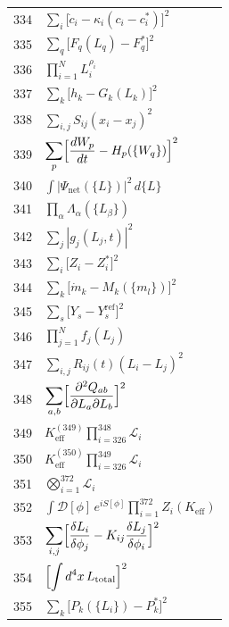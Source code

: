 \documentclass[12pt,a4paper]{article}
\begin{document}
\begin{longtable}{r p{}}
		334 & \(\displaystyle \sum_i\bigl[\dot c_i - \kappa_i(c_i - c_i^*)\bigr]^2\) \\
		335 & \(\displaystyle \sum_q\bigl[F_q(L_q) - F_q^*\bigr]^2\) \\
		336 & \(\displaystyle \prod_{i=1}^N L_i^{\rho_i}\) \\
		337 & \(\displaystyle \sum_k\bigl[h_k - G_k(L_k)\bigr]^2\) \\
		338 & \(\displaystyle \sum_{i,j}S_{ij}(x_i - x_j)^2\) \\
		339 & \(\displaystyle \sum_p\Bigl[\frac{dW_p}{dt} - H_p(\{W_q\})\Bigr]^2\) \\
		340 & \(\displaystyle \int|\Psi_{\text{net}}(\{L\})|^2\,d\{L\}\) \\
		341 & \(\displaystyle \prod_\alpha\Lambda_\alpha(\{L_\beta\})\) \\
		342 & \(\displaystyle \sum_j|g_j(L_j,t)|^2\) \\
		343 & \(\displaystyle \sum_i\bigl[Z_i - Z_i^*\bigr]^2\) \\
		344 & \(\displaystyle \sum_k\bigl[\dot m_k - M_k(\{m_l\})\bigr]^2\) \\
		345 & \(\displaystyle \sum_s\bigl[Y_s - Y_s^{\text{ref}}\bigr]^2\) \\
		346 & \(\displaystyle \prod_{j=1}^N f_j(L_j)\) \\
		347 & \(\displaystyle \sum_{i,j}R_{ij}(t)(L_i - L_j)^2\) \\
		348 & \(\displaystyle \sum_{a,b}\Bigl[\frac{\partial^2 Q_{ab}}{\partial L_a\partial L_b}\Bigr]^2\) \\
		349 & \(\displaystyle K^{(349)}_{\mathrm{eff}}\prod_{i=326}^{348}\mathcal{L}_i\) \\
		350 & \(\displaystyle K^{(350)}_{\mathrm{eff}}\prod_{i=326}^{349}\mathcal{L}_i\) \\
		351 & \(\displaystyle \bigotimes_{i=1}^{372}\mathcal{L}_i\) \\
		352 & \(\displaystyle \int\mathcal{D}[\phi]\,e^{iS[\phi]}\prod_{i=1}^{372}Z_i(K_{\mathrm{eff}})\) \\
		353 & \(\displaystyle \sum_{i,j}\Bigl[\frac{\delta L_i}{\delta\phi_j} - K_{ij}\frac{\delta L_j}{\delta\phi_i}\Bigr]^2\) \\
		354 & \(\displaystyle \Bigl[\int d^4x\,L_{\text{total}}\Bigr]^2\) \\
		355 & \(\displaystyle \sum_k\bigl[P_k(\{L_i\}) - P_k^*\bigr]^2\) \\

\end{longtable}
\end{document}
